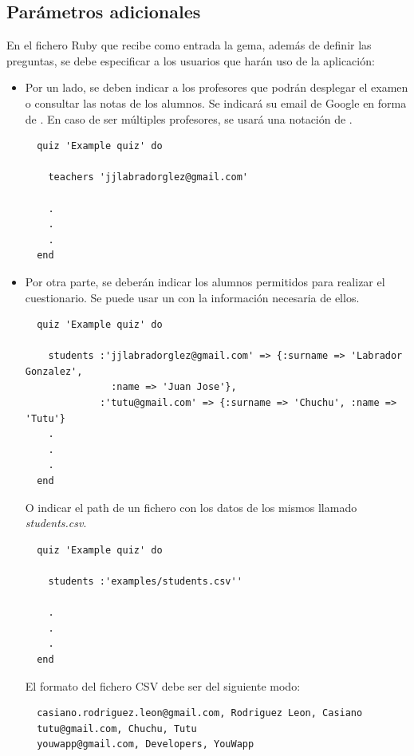 \subsection{Par\'ametros adicionales}
\label{subsec:Apendice2.12}

En el fichero Ruby que recibe como entrada la gema, adem\'as de definir las preguntas, se debe especificar a los usuarios que har\'an
uso de la aplicaci\'on:

\begin{itemize}
  \item Por un lado, se deben indicar a los profesores que podr\'an desplegar el examen o consultar las notas de los alumnos. Se indicar\'a
  su email de Google en forma de . En caso de ser m\'ultiples profesores, se usar\'a una notaci\'on de . 
  \begin{lstlisting}
  quiz 'Example quiz' do
    
    teachers 'jjlabradorglez@gmail.com'
    
    .
    .
    .
  end
  \end{lstlisting}
  
  \item Por otra parte, se deber\'an indicar los alumnos permitidos para realizar el cuestionario. Se puede usar un  con 
  la informaci\'on necesaria de ellos. 
  \begin{lstlisting}
  quiz 'Example quiz' do
    
    students :'jjlabradorglez@gmail.com' => {:surname => 'Labrador Gonzalez', 
               :name => 'Juan Jose'}, 
             :'tutu@gmail.com' => {:surname => 'Chuchu', :name => 'Tutu'}
    .
    .
    .
  end
  \end{lstlisting}
  
  O indicar el path de un fichero  con los datos de los mismos llamado \textit{students.csv}.
  \begin{lstlisting}
  quiz 'Example quiz' do
    
    students :'examples/students.csv''
    
    .
    .
    .
  end
  \end{lstlisting}
  
  El formato del fichero CSV debe ser del siguiente modo:
  \begin{verbatim}
  casiano.rodriguez.leon@gmail.com, Rodriguez Leon, Casiano
  tutu@gmail.com, Chuchu, Tutu
  youwapp@gmail.com, Developers, YouWapp
  \end{verbatim}
  
\end{itemize}

